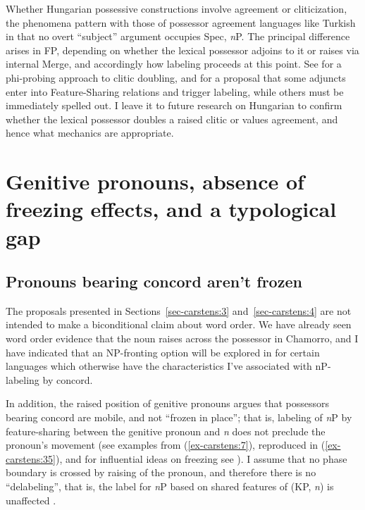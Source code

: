 \documentclass[output=paper
,modfonts
,nonflat]{langsci/langscibook}
\begin{document}
Whether Hungarian possessive constructions involve agreement or cliticization, the phenomena pattern with those of possessor agreement languages like Turkish in that no overt “subject” argument occupies Spec, \textit{n}P. The principal difference arises in FP, depending on whether the lexical possessor adjoins to it or raises via internal Merge, and accordingly how labeling proceeds at this point. See \citet{Preminger2014} for a phi-probing approach to clitic doubling, and \citet{Oseki2014} for a proposal that some adjuncts enter into Feature-Sharing relations and trigger labeling, while others must be immediately spelled out. I leave it to future research on Hungarian to confirm whether the lexical possessor doubles a raised clitic or values agreement, and hence what mechanics are appropriate.

\section{Genitive pronouns, absence of freezing effects, and a typological gap} \label{sec-carstens:5}\largerpage
\subsection{Pronouns bearing concord aren't frozen}\label{sec-carstens:5.1}
The proposals presented in Sections~\ref{sec-carstens:3} and~\ref{sec-carstens:4} are not intended to make a biconditional claim about word order. We have already seen word order evidence that the noun raises across the possessor in Chamorro, and I have indicated that an NP-fronting option will be explored in  for certain languages which otherwise have the characteristics I’ve associated with nP-labeling by concord. 

In addition, the raised position of genitive pronouns argues that possessors bearing concord are mobile, and not ``frozen in place”; that is, labeling of \textit{n}P by feature-sharing between the genitive pronoun and \textit{n} does not preclude the pronoun’s movement (see examples from (\ref{ex-carstens:7}), reproduced in (\ref{ex-carstens:35}), and for influential ideas on freezing see \citealt{Rizzi2006,Rizzi_Shlonsky2007}). I assume that no phase boundary is crossed by raising of the pronoun, and therefore there is no “delabeling”, that is, the label for \textit{n}P based on shared features of (KP, \textit{n}) is unaffected \citep[11]{Chomsky2015}.
\end{document}
